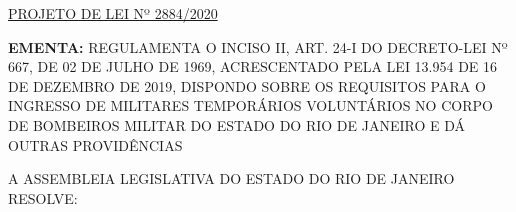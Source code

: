 \documentclass[10pt]{article}
\date{}
\begin{document}
\maketitle
\begin{center}
  \huge
  \vspace{-3cm}\href{http://alerjln1.alerj.rj.gov.br/scpro1923.nsf/f4b46b3cdbba990083256cc900746cf6/953b6aff197410c1032585a6005ec982?OpenDocument}{PROJETO DE LEI Nº 2884/2020}
\bigskip
\bigskip
\bigskip
  
\end{center}

\textbf{EMENTA:} 
REGULAMENTA O INCISO II, ART. 24-I DO DECRETO-LEI Nº 667, DE 02 DE JULHO DE 1969, ACRESCENTADO PELA LEI 13.954 DE 16 DE DEZEMBRO DE 2019, DISPONDO SOBRE OS REQUISITOS PARA O INGRESSO DE MILITARES TEMPORÁRIOS VOLUNTÁRIOS NO CORPO DE BOMBEIROS MILITAR DO ESTADO DO RIO DE JANEIRO E DÁ OUTRAS PROVIDÊNCIAS








\bigskip

\noindent
A ASSEMBLEIA LEGISLATIVA DO ESTADO DO RIO DE JANEIRO RESOLVE:
\end{document}
